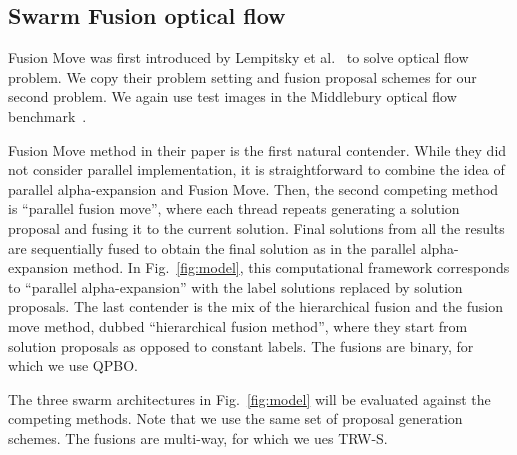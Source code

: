 \subsection{Swarm Fusion optical flow}

Fusion Move was first introduced by Lempitsky et al.~\cite{viktor} to
solve optical flow problem.
We copy their problem setting and fusion proposal schemes for our second
problem.  We again use test images in the Middlebury optical flow
benchmark~\cite{middlebury_optical_flow}.

 Fusion Move method in their paper is
the first natural contender. While they did not consider parallel
implementation, it is straightforward to combine the idea of parallel
alpha-expansion and Fusion Move. Then, the second competing method is
``parallel fusion move'', where each thread repeats generating a
solution proposal and fusing it to the current solution. Final solutions
from all the results are sequentially fused to obtain the final solution
as in the parallel alpha-expansion method. In Fig.~\ref{fig:model}, this
computational framework corresponds to ``parallel alpha-expansion'' with
the label solutions replaced by solution proposals. The last contender
is the mix of the hierarchical fusion and the fusion move method, dubbed
``hierarchical fusion method'', where they start from solution proposals
as opposed to constant labels.
%
The fusions are binary, for which we use QPBO.

The three swarm architectures in Fig.~\ref{fig:model} will be evaluated
against the competing methods. Note that we use the same set of proposal
generation schemes. The fusions are multi-way, for which we ues TRW-S.
